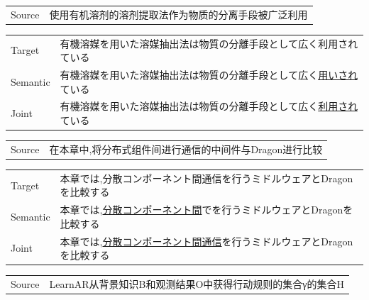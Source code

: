 \vspace{0.1cm}
\begin{table}[h]
    \centering
    \begin{CJK}{UTF8}{gbsn}
        \begin{tabularx}{\textwidth}{p{1.2cm}b}\toprule
            Source & 使用有机溶剂的溶剂提取法作为物质的分离手段被广泛利用 \\
        \end{tabularx}
    \end{CJK}

    \begin{CJK}{UTF8}{ipxm}
        \begin{tabularx}{\textwidth}{p{1.2cm}b}
            Target & 有機溶媒を用いた溶媒抽出法は物質の分離手段として広く利用されている \\
            Semantic & 有機溶媒を用いた溶媒抽出法は物質の分離手段として広く\underline{用いされ}ている \\
            Joint & 有機溶媒を用いた溶媒抽出法は物質の分離手段として広く\underline{利用され}ている \\\midrule
        \end{tabularx}
    \end{CJK}

    \begin{CJK}{UTF8}{gbsn}
        \begin{tabularx}{\textwidth}{p{1.2cm}b}
            Source & 在本章中,将分布式组件间进行通信的中间件与Dragon进行比较 \\
        \end{tabularx}
    \end{CJK}

    \begin{CJK}{UTF8}{ipxm}
        \begin{tabularx}{\textwidth}{p{1.2cm}b}
            Target & 本章では,分散コンポーネント間通信を行うミドルウェアとDragonを比較する \\
            Semantic & 本章では,\underline{分散コンポーネント間}でを行うミドルウェアとDragonを比較する \\
            Joint & 本章では,\underline{分散コンポーネント間通信}を行うミドルウェアとDragonを比較する \\\midrule
        \end{tabularx}
    \end{CJK}

    \begin{CJK}{UTF8}{gbsn}
        \begin{tabularx}{\textwidth}{p{1.2cm}b}
            Source & LearnAR从背景知识B和观测结果O中获得行动规则的集合γ的集合H \\
        \end{tabularx}
    \end{CJK}


\end{table}
